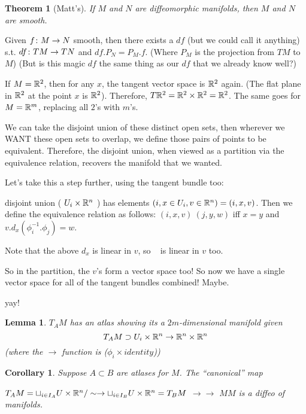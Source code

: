 \documentclass[11pt]{amsbook}
\newenvironment{dateenv}{
	\vspace{1em}
}{
	\vspace{1em}
}
\newcommand{\mydate}[4]{
	\newdate{#1}{#2}{#3}{#4}
	\begin{dateenv}
		\hfill\displaydate{#1}
	\end{dateenv}
}
\theoremstyle{mystyle} %
\newtheorem{thrm}[thm]{Theorem}
\newtheorem{coro}[thm]{Corollary}
\newtheorem{lemm}[thm]{Lemma}
\numberwithin{thm}{section}
\newcommand{\x}{\times}
\begin{document}
\begin{thrm}[Matt's]
	If $M$ and $N$ are diffeomorphic manifolds, then $M$ and $N$ are smooth.
\end{thrm}


\mydate{d1}{21}{9}{2016}

Given $f\colon M \to N$ smooth, then there exists a $df$ (but we could call it anything) s.t. $df \colon TM \to TN$ and $df.P_N = P_M.f$.  (Where $P_M$ is the projection from $TM$ to $M$)  (But is this magic $df$ the same thing as our $df$ that we already know well?)

\begin{example}
	If $M = {\mathbb R}^2$, then for any $x$, the tangent vector space is ${\mathbb R}^2$ again.  (The flat plane in ${\mathbb R}^2$ at the point $x$ is ${\mathbb R}^2$).  Therefore, $T{\mathbb R}^2 = {\mathbb R}^2 \times {\mathbb R}^2 = {\mathbb R}^2$.  The same goes for $M = {\mathbb R}^m$, replacing all $2$'s with $m$'s.
\end{example}

We can take the disjoint union of these distinct open sets, then wherever we WANT these open sets to overlap, we define those pairs of points to be equivalent.  Therefore, the disjoint union, when viewed as a partition via the equivalence relation, recovers the manifold that we wanted.

Let's take this a step further, using the tangent bundle too:

disjoint union ( $U_i \times {\mathbb R}^n$ ) has elements $(i, x \in U_i, v \in {\mathbb R}^n) = (i, x, v)$.
Then we define the equivalence relation as follows:
$(i, x, v) ~ (j, y, w)$ iff $x=y$ and $v.d_x(\phi_i^{-1}.\phi_j) = w$.

Note that the above $d_x$ is linear in $v$, so ~ is linear in $v$ too.

So in the partition, the $v$'s form a vector space too!  So now we have a single vector space for all of the tangent bundles combined!  Maybe.

yay!

\begin{lemm}
	$T_A M$ has an atlas showing its a $2m$-dimensional manifold given
	$$T_A M \supset U_i \x \R^n \to \R^n \x \R^n$$ (where the $\to$ function is ($\phi_i \times identity$))
\end{lemm}
\begin{coro}
	Suppose $A \subset B$ are atlases for $M$.  The ``canonical'' map

	$T_A M = \sqcup_{i \in I_A} U \times {\mathbb R}^n/ \sim \to \sqcup_{i
          \in I_B} U \times {\mathbb R}^n = T_B M$
				$\to										\to$
				$M 										M$
	is a diffeo of manifolds.
\end{coro}
\end{document}
